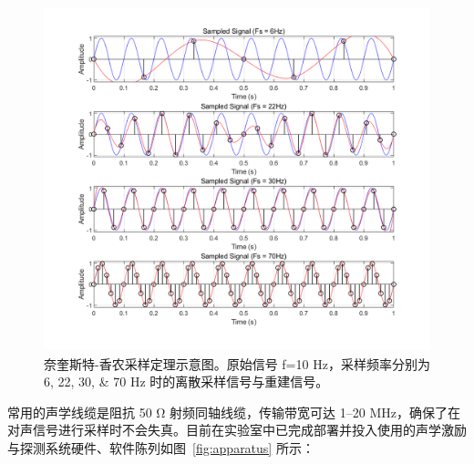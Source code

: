 \begin{figure}[!htp]
  \centering
  \includegraphics[height=10cm]{figures/2_sample_theorem.png}
  \caption{奈奎斯特-香农采样定理示意图。原始信号 f=10 \unit{\hertz}，采样频率分别为 \numlist{6;22;30;70} \unit{\hertz} 时的离散采样信号与重建信号。}
  \label{fig:sample_theorem}
\end{figure}

常用的声学线缆是阻抗 50 \unit{\ohm} 射频同轴线缆，传输带宽可达 \numrange{1}{20} \unit{\mega\hertz}，确保了在对声信号进行采样时不会失真。目前在实验室中已完成部署并投入使用的声学激励与探测系统硬件、软件陈列如图~\ref{fig:apparatus} 所示：

